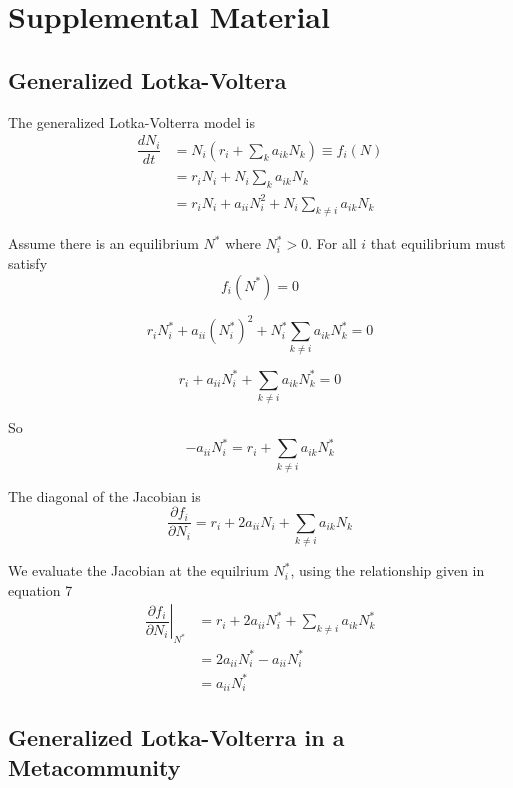 \documentclass{article}
\begin{document}
\section*{Supplemental Material}

\subsection*{Generalized Lotka-Voltera}

The generalized Lotka-Volterra model is
\begin{align}
\dfrac{dN_i}{dt} &= N_i\left(r_i + \sum_k a_{ik}N_k\right) \equiv f_i(N)\\
&=r_iN_i + N_i\sum_k a_{ik}N_k \\
&=r_iN_i + a_{ii} N_i^2 + N_i \sum_{k\neq i} a_{ik}N_k
\end{align}

Assume there is an equilibrium $N^*$ where $N^*_i>0$. For all $i$ that equilibrium must satisfy
\begin{equation}
f_i(N^*) = 0
\end{equation}

\begin{equation}
r_iN^*_i + a_{ii} (N^*_i)^2 + N^*_i \sum_{k\neq i} a_{ik}N^*_k = 0
\end{equation}

\begin{equation}
r_i + a_{ii} N^*_i + \sum_{k\neq i} a_{ik}N^*_k = 0 
\end{equation}

So 
\begin{equation}
-a_{ii} N^*_i = r_i + \sum_{k\neq i} a_{ik}N^*_k
\end{equation}

The diagonal of the Jacobian is
\begin{equation}
\dfrac{\partial f_i}{\partial N_i} = r_i + 2a_{ii} N_i + \sum_{k\neq i} a_{ik}N_k
\end{equation}

We evaluate the Jacobian at the equilrium $N_i^*$, using the relationship given in equation 7
\begin{align}
    \left.\dfrac{\partial f_i}{\partial N_i} \right \rvert_{N^*} 
    &= r_i + 2a_{ii} N^*_i + \sum_{k\neq i} a_{ik}N^*_k \\
    &= 2a_{ii} N^*_i - a_{ii}N^*_i \\ 
    &= a_{ii} N^*_i
\end{align}


\subsection*{Generalized Lotka-Volterra in a Metacommunity}
\end{document}
